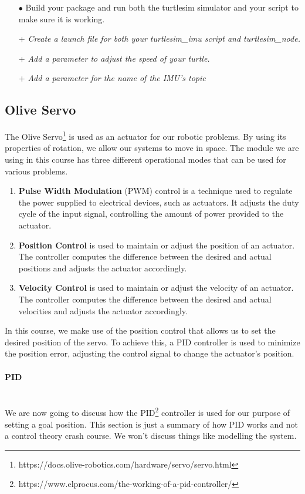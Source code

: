 \documentclass{article}
\begin{document}
\begin{enumerate}
    \item[$\bullet$] Build your package and run both the turtlesim simulator and your script to make sure it is working.

    \item[+] \textit{Create a launch file for both your turtlesim\_imu script and turtlesim\_node.} 

    \item[+] \textit{Add a parameter to adjust the speed of your turtle.}

    \item[+] \textit{Add a parameter for the name of the IMU's topic}
\end{enumerate}


\subsection{Olive Servo}
The Olive Servo\footnote{https://docs.olive-robotics.com/hardware/servo/servo.html} is used as an actuator for our robotic problems. By using its properties of rotation, we allow our systems to move in space. The module we are using in this course has three different operational modes that can be used for various problems.
\begin{enumerate}
    \item \textbf{Pulse Width Modulation} (PWM) control is a technique used to regulate the power supplied to electrical devices, such as actuators. It adjusts the duty cycle of the input signal, controlling the amount of power provided to the actuator.
    \item \textbf{Position Control} is used to maintain or adjust the position of an actuator. The controller computes the difference between the desired and actual positions and adjusts the actuator accordingly.
    \item \textbf{Velocity Control} is used to maintain or adjust the velocity of an actuator. The controller computes the difference between the desired and actual velocities and adjusts the actuator accordingly.
\end{enumerate}

\noindent
In this course, we make use of the position control that allows us to set the desired position of the servo. To achieve this, a PID controller is used to minimize the position error, adjusting the control signal to change the actuator's position.

\paragraph{PID}~\\
We are now going to discuss how the PID\footnote{https://www.elprocus.com/the-working-of-a-pid-controller/} controller is used for our purpose of setting a goal position. This section is just a summary of how PID works and not a control theory crash course. We won't discuss things like modelling the system.
\end{document}
